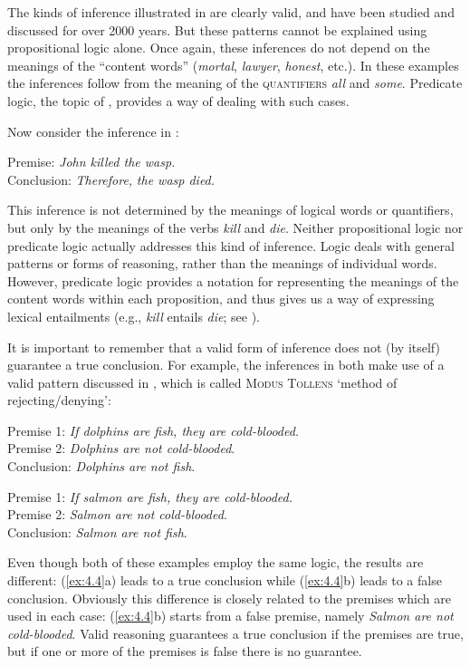 The kinds of inference illustrated in  are clearly valid, and have been studied and discussed for over 2000 years. But these patterns cannot be explained using propositional logic alone. Once again, these inferences do not depend on the meanings of the “content words” (\textit{mortal}, \textit{lawyer}, \textit{honest}, etc.). In these examples the inferences follow from the meaning of the \textsc{quantifiers} \textit{all} and \textit{some}. Predicate logic, the topic of , provides a way of dealing with such cases.



Now consider the inference in :


\ea \label{ex:4.3}
Premise: \textit{John killed the wasp.\\
}\FelixHRule
Conclusion: \textit{Therefore,} \textit{the wasp died.}
\z


This inference is not determined by the meanings of logical words or quantifiers, but only by the meanings of the verbs \textit{kill} and \textit{die}. Neither propositional logic nor predicate logic actually addresses this kind of inference. Logic deals with general patterns or forms of reasoning, rather than the meanings of individual words. However, predicate logic provides a notation for representing the meanings of the content words within each proposition, and thus gives us a way of expressing lexical entailments (e.g., \textit{kill} entails \textit{die}; see ).



It is important to remember that a valid form of inference does not (by itself) guarantee a true conclusion. For example, the inferences in  both make use of a valid pattern discussed in , which is called \textsc{Modus Tollens} ‘method of rejecting/denying’:


\ea \label{ex:4.4}
\ea  Premise 1: \textit{If dolphins are fish, they are cold-blooded.}\\
Premise 2: \textit{Dolphins are not cold-blooded}.\\
\FelixHRule
Conclusion: \textit{Dolphins are not fish}.
\bigskip 

\ex Premise 1: \textit{If salmon are fish, they are cold-blooded.}\\
Premise 2: \textit{Salmon are not cold-blooded}.\\
\FelixHRule
Conclusion: \textit{Salmon are not fish}.
                       \z
\z


Even though both of these examples employ the same logic, the results are different: (\ref{ex:4.4}a) leads to a true conclusion while (\ref{ex:4.4}b) leads to a false conclusion. Obviously this difference is closely related to the premises which are used in each case: (\ref{ex:4.4}b) starts from a false premise, namely \textit{Salmon are not cold-blooded}. Valid reasoning guarantees a true conclusion if the premises are true, but if one or more of the premises is false there is no guarantee.




